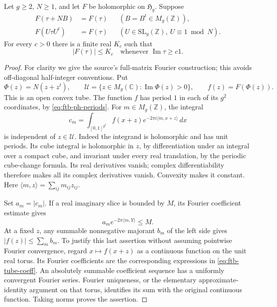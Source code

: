 \begin{srlemma}
\label{lem:ftb-ph-koecher}
Let \(g\geq2\), \(N\geq1\), and let \(F\) be holomorphic on
\(\mathfrak H_g\).  Suppose
\[
 \begin{aligned}
 F(\tau+NB)&=F(\tau) &&(B=B^t\in M_g(\mathbb Z)),\\
 F(U\tau U^t)&=F(\tau)
 &&(U\in\mathrm{SL}_g(\mathbb Z),\ U\equiv1\bmod N).
 \end{aligned}                                             \tag{W1}\label{eq:ftb-ph-periods}
\]
For every \(c>0\) there is a finite real \(K_c\) such that
\[
       |F(\tau)|\leq K_c\quad
          \text{whenever }\operatorname{Im}\tau\geq c1.
 \tag{W2}\label{eq:ftb-ph-cone-bound}
\]
\end{srlemma}
\begin{proof}
For clarity we give the source's full-matrix Fourier construction;
this avoids off-diagonal half-integer conventions.
Put
\[
 \Phi(z)=N(z+z^t),\qquad
 \mathcal U=\{z\in M_g(\mathbb C):\operatorname{Im}\Phi(z)>0\},
 \qquad f(z)=F(\Phi(z)).
\]
This is an open convex tube.  The function \(f\) has period \(1\)
in each of its \(g^2\) coordinates, by \eqref{eq:ftb-ph-periods}.
For \(m\in M_g(\mathbb Z)\), the integral
\[
 c_m=\int_{[0,1]^{g^2}}
 f(x+z)e^{-2\pi i\langle m,x+z\rangle}\,dx
 \tag{W3}\label{eq:ftb-tube-coeff}
\]
is independent of \(z\in\mathcal U\).
Indeed the integrand is holomorphic and has unit periods.
Its cube integral is holomorphic in \(z\), by differentiation
under an integral over a compact cube, and invariant under every
real translation, by the periodic cube-change formula.
Its real derivatives vanish; complex differentiability therefore
makes all its complex derivatives vanish.  Convexity makes it
constant.  Here \(\langle m,z\rangle=\sum_{ij}m_{ij}z_{ij}\).

Set \(a_m=|c_m|\).
If a real imaginary slice is bounded by \(M\), its Fourier
coefficient estimate gives
\[
          a_m e^{-2\pi\langle m,Y\rangle}\leq M.
 \tag{W4}\label{eq:ftb-tube-coeff-bound}
\]
At a fixed \(z\), any summable nonnegative majorant \(b_m\) of
the left side gives \(|f(z)|\leq\sum_m b_m\).
To justify this last assertion without assuming pointwise Fourier
convergence, regard \(x\mapsto f(x+z)\) as a continuous function
on the unit real torus.  Its Fourier coefficients are the
corresponding expressions in \eqref{eq:ftb-tube-coeff}.
An absolutely summable coefficient sequence has a uniformly
convergent Fourier series.  Fourier uniqueness, or the elementary
approximate-identity argument on that torus, identifies its sum
with the original continuous function.  Taking norms proves the
assertion.


\end{proof}
